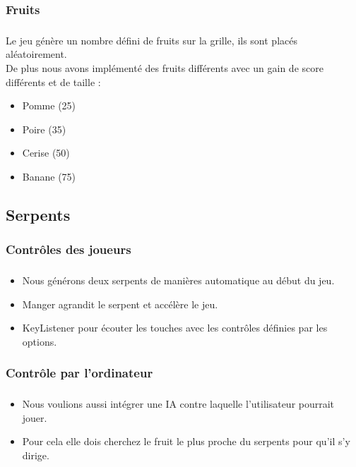 \documentclass{beamer}
\begin{document}
\subsubsection{Fruits}
\begin{frame}
\frametitle{\insertsubsubsection}
\framesubtitle{\insertsubsection}
Le jeu génère un nombre défini de fruits sur la grille, ils sont placés aléatoirement.\\
De plus nous avons implémenté des fruits différents avec un gain de score différents et de taille :
\begin{itemize}
\item Pomme (25)
\item Poire (35)
\item Cerise (50)
\item Banane (75)
\end{itemize}

\end{frame}
\subsection{Serpents}
\subsubsection{Contrôles des joueurs}
\begin{frame}
\frametitle{\insertsubsubsection}
\framesubtitle{\insertsubsection}
\begin{itemize}[<+->]
\item Nous générons deux serpents de manières automatique au début du jeu.\\
\item Manger agrandit le serpent et accélère le jeu.\\
\item KeyListener pour écouter les touches avec les contrôles définies par les options.\\
\end{itemize}

\end{frame}
\subsubsection{Contrôle par l'ordinateur}
\begin{frame}
\frametitle{\insertsubsubsection}
\framesubtitle{\insertsubsection}
\begin{itemize}
\item Nous voulions aussi intégrer une IA contre laquelle l'utilisateur pourrait jouer.
\item Pour cela elle dois cherchez le fruit le plus proche du serpents pour qu'il s'y dirige.
\end{itemize}


\end{frame}
\end{document}
